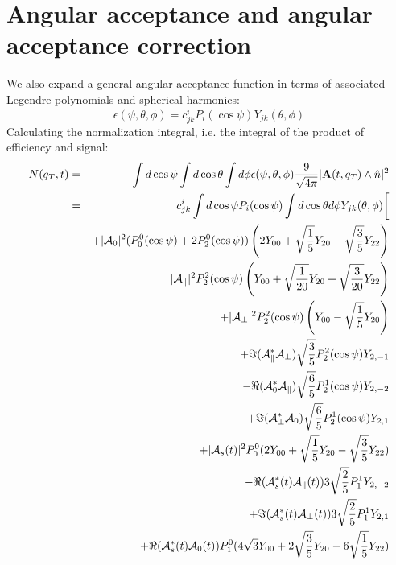 \documentclass[a4paper,10pt,twosided]{article}
\begin{document}
\section{Angular acceptance and angular acceptance correction}
We also expand a general angular acceptance function in terms of associated Legendre polynomials and spherical harmonics:
\begin{equation}
   \epsilon(\psi,\theta,\phi) = c^{i}_{jk} P_i(\cos\psi)Y_{jk}(\theta,\phi)
   \label{eq:eps_exp}
\end{equation}
Calculating the normalization integral, i.e. the integral of the product of efficiency and signal:
\begin{eqnarray}
    N(q_T,t)  &=&  \int d\cos\psi\int d\cos\theta \int d\phi \epsilon(\psi,\theta,\phi) \frac{9}{\sqrt{4\pi}}|{\bf A}(t,q_T) \wedge \hat{n}|^2 \\
      &=& c^i_{jk} \int d\cos\psi   P_i(\cos\psi)  \int d\cos\theta d\phi Y_{jk}(\theta,\phi) 
          \biggl[  \\
          &&                  +|{\cal A}_0|^2  (P_0^0(\cos\psi)+2P_2^0(\cos\psi) ) \left( 2Y_{00}+\sqrt{\frac{1}{5}}Y_{20}-\sqrt{\frac{3}{5}}Y_{22} \right) \\
          &&                   |{\cal A}_\parallel|^2 P_2^2(\cos\psi) \left( Y_{00}+\sqrt{\frac{1}{20}}Y_{20}+\sqrt{\frac{3}{20}}Y_{22}  \right)  \\
          &&                  +|{\cal A}_\perp|^2  P_2^2(\cos\psi) \left( Y_{00} - \sqrt{\frac{1}{5}}Y_{20}\right)\\
          &&                  +\Im({\cal A}_\parallel^*{\cal A}_\perp)\sqrt{\frac{3}{5}}P_2^2(\cos\psi) Y_{2,-1}  \\
          &&                  -\Re({\cal A}_0^*{\cal A}_\parallel  )  \sqrt{\frac{6}{5}}P_2^1(\cos\psi) Y_{2,-2} \\
          &&                  +\Im({\cal A}_\perp^* {\cal A}_0 )      \sqrt{\frac{6}{5}}P_2^1(\cos\psi)Y_{2,1} \\
          &&                  +|{\cal A}_{s}(t)|^2  P_0^0 (2Y_{00} + \sqrt{\frac{1}{5}}Y_{20} -\sqrt{\frac{3}{5}} Y_{22}) \\
          &&                  -\Re({\cal A}_{s}^*(t){\cal A}_\parallel(t)) 3\sqrt{\frac{2}{5}} P_1^1 Y_{2,-2}\\
          &&                  +\Im({\cal A}_{s}^*(t){\cal A}_\perp(t)) 3\sqrt{\frac{2}{5}} P_1^1 Y_{2,1}\\
          &&                  +\Re({\cal A}_{s}^*(t){\cal A}_0(t)) P_1^0( 4\sqrt{3}  Y_{00} + 2 \sqrt{\frac{3}{5}} Y_{20} - 6 \sqrt{\frac{1}{5}}Y_{22})

\end{eqnarray}
\end{document}
